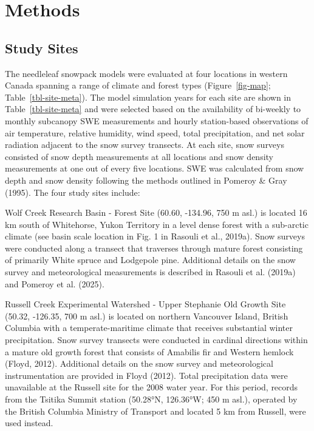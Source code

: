 \documentclass[
  letterpaper,
]{tex/uofsthesis-cs}
\begin{document}
\section{Methods}\label{methods-1}

\subsection{Study Sites}\label{study-sites}

The needleleaf snowpack models were evaluated at four locations in
western Canada spanning a range of climate and forest types
(Figure~\ref{fig-map}; Table~\ref{tbl-site-meta}). The model simulation
years for each site are shown in Table~\ref{tbl-site-meta} and were
selected based on the availability of bi-weekly to monthly subcanopy SWE
measurements and hourly station-based observations of air temperature,
relative humidity, wind speed, total precipitation, and net solar
radiation adjacent to the snow survey transects. At each site, snow
surveys consisted of snow depth measurements at all locations and snow
density measurements at one out of every five locations. SWE was
calculated from snow depth and snow density following the methods
outlined in Pomeroy \& Gray (1995). The four study sites include:

Wolf Creek Research Basin - Forest Site (60.60, -134.96, 750 m asl.) is
located 16 km south of Whitehorse, Yukon Territory in a level dense
forest with a sub-arctic climate (see basin scale location in Fig. 1 in
Rasouli et al., 2019a). Snow surveys were conducted along a transect
that traverses through mature forest consisting of primarily White
spruce and Lodgepole pine. Additional details on the snow survey and
meteorological measurements is described in Rasouli et al. (2019a) and
Pomeroy et al. (2025).

Russell Creek Experimental Watershed - Upper Stephanie Old Growth Site
(50.32, -126.35, 700 m asl.) is located on northern Vancouver Island,
British Columbia with a temperate-maritime climate that receives
substantial winter precipitation. Snow survey transects were conducted
in cardinal directions within a mature old growth forest that consists
of Amabilis fir and Western hemlock (Floyd, 2012). Additional details on
the snow survey and meteorological instrumentation are provided in Floyd
(2012). Total precipitation data were unavailable at the Russell site
for the 2008 water year. For this period, records from the Tsitika
Summit station (50.28°N, 126.36°W; 450 m asl.), operated by the British
Columbia Ministry of Transport and located 5 km from Russell, were used
instead.
\end{document}

